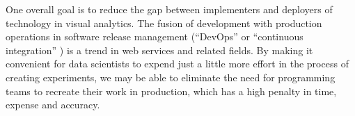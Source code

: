 One overall goal is to reduce the gap between implementers and deployers
of technology in visual analytics. The fusion of development with production
operations in software release management (``DevOps'' \cite{Httermann:2012:DD}
or ``continuous integration'' \cite{Fowler:2006:Continuous}) is a trend in web
services and related fields.
By making it convenient for data scientists to expend just a little more effort
in the process of creating experiments, we may be able to eliminate the need
for programming teams to recreate their work in production, which has a high
penalty in time, expense and accuracy.
